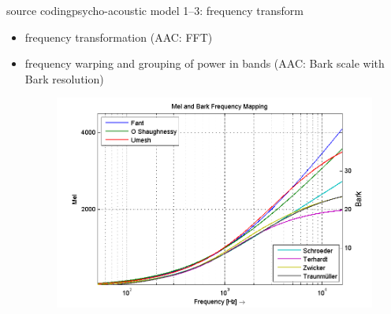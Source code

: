 	\begin{frame}{source coding}{psycho-acoustic model 1--3: frequency transform}
		\begin{itemize}
            \item   frequency transformation (AAC: FFT)
            \item   frequency warping and grouping of power in bands (AAC: Bark scale with  Bark resolution)
            \begin{figure}
				\centering
					\includegraphics[scale=0.6]{Graph/mel}
			\end{figure}
        \end{itemize}
	\end{frame}
	
